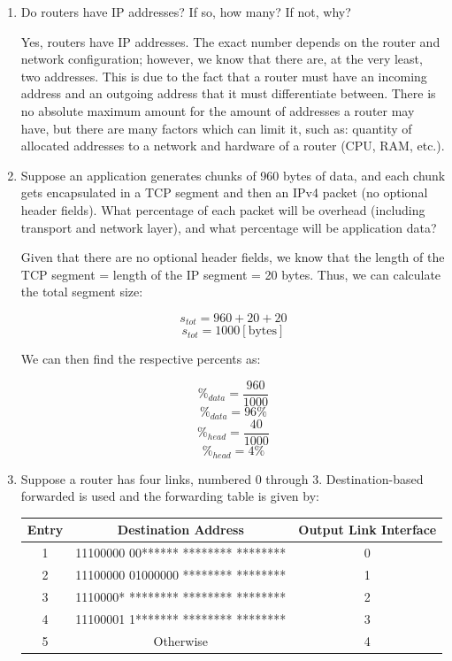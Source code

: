 \begin{enumerate}

  \item Do routers have IP addresses? If so, how many? If not, why?

    Yes, routers have IP addresses. The exact number depends on the router and network configuration; however, we know that there are, at the very least, two addresses. This is due to the fact that a router must have an incoming address and an outgoing address that it must differentiate between. There is no absolute maximum amount for the amount of addresses a router may have, but there are many factors which can limit it, such as: quantity of allocated addresses to a network and hardware of a router (CPU, RAM, etc.).

  \item Suppose an application generates chunks of 960 bytes of data, and each chunk gets encapsulated in a TCP segment and then an IPv4 packet (no optional header fields). What percentage of each packet will be overhead (including transport and network layer), and what percentage will be application data?

    Given that there are no optional header fields, we know that the length of the TCP segment = length of the IP segment = 20 bytes. Thus, we can calculate the total segment size:

    $$s_{tot}=960+20+20$$
    $$s_{tot}=1000[\text{bytes}]$$

    We can then find the respective percents as:

    $$\%_{data}=\frac{960}{1000}$$
    $$\boxed{\%_{data}=96\%}$$
    $$\%_{head}=\frac{40}{1000}$$
    $$\boxed{\%_{head}=4\%}$$

  \item Suppose a router has four links, numbered 0 through 3. Destination-based forwarded is used and the forwarding table is given by:

    \begin{center}
      \begin{tabular}[h!]{|c|c|c|}
        \hline
        Entry & Destination Address & Output Link Interface\\
        \hline
        1 & 11100000 00****** ******** ******** & 0\\
        \hline
        2 & 11100000 01000000 ******** ******** & 1\\
        \hline
        3 & 1110000* ******** ******** ******** & 2\\
        \hline
        4 & 11100001 1******* ******** ******** & 3\\
        \hline
        5 & Otherwise & 4\\
        \hline
      \end{tabular}
    \end{center}


\end{enumerate}
